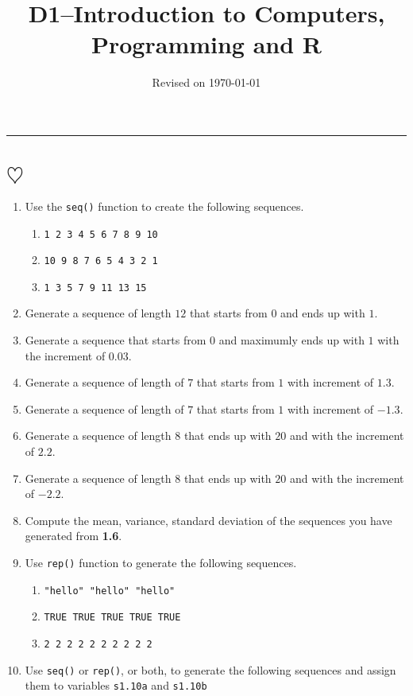 \documentclass[a4paper]{article}
\title{D1--Introduction to Computers, Programming and R}
\date{\small{Revised on \today}}
\begin{document}
\maketitle
\hrule


\section{$\heartsuit$}
  \begin{enumerate}
   \item Use the \texttt{seq()} function to create the following sequences.
    \begin{enumerate}
    \item \texttt{1  2  3  4  5  6  7  8  9 10}
    \item \texttt{10  9  8  7  6  5  4  3  2  1}
    \item \texttt{1  3  5  7  9 11 13 15}
    \end{enumerate}
  \item Generate a sequence of length $12$ that starts from $0$ and ends up with
    $1$.
  \item  Generate a sequence that starts from $0$ and maximumly ends up with
    $1$ with the increment of $0.03$.
  \item Generate a sequence of length of $7$ that starts from $1$ with increment
    of $1.3$.
  \item Generate a sequence of length of $7$ that starts from $1$ with increment
    of $-1.3$.
  \item Generate a sequence of length $8$ that ends up with $20$ and with the
    increment of $2.2$.
  \item Generate a sequence of length $8$ that ends up with $20$ and with the
    increment of $-2.2$.
  \item Compute the mean, variance, standard deviation of the sequences you
    have generated from \textbf{1.6}.
  \item Use \texttt{rep()} function to generate the following sequences.
    \begin{enumerate}
    \item \texttt{"hello" "hello" "hello"}
    \item \texttt{TRUE TRUE TRUE TRUE TRUE}
    \item  \texttt{2 2 2 2 2 2 2 2 2 2}
    \end{enumerate}
  \item Use \texttt{seq()} or \texttt{rep()}, or both, to generate the following
    sequences and assign them to variables \texttt{s1.10a} and \texttt{s1.10b}

\end{enumerate}
\end{document}
